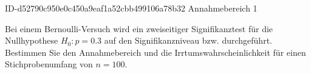 \begin{exercise}
      {ID-d52790c950e0c450a9eaf1a52cbb499106a78b32}
      {Annahmebereich 1}
  \ifproblem\problem\par
    Bei einem Bernoulli-Versuch wird ein zweiseitiger Signifikanztest für
    die Nullhypothese $H_0:p=\num{0.3}$ auf den Signifikanzniveau 
    bzw.  durchgeführt. Bestimmen Sie den Annahmebereich und die
    Irrtumswahrscheinlichkeit für einen Stichprobenumfang von $n=100$.
  \fi
\end{exercise}
